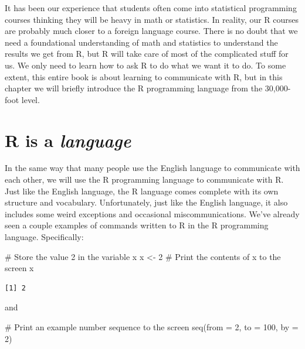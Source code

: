 \documentclass[
  letterpaper,
  DIV=11,
  numbers=noendperiod]{scrreprt}
\newenvironment{Shaded}{\begin{snugshade}}{\end{snugshade}}
\newcommand{\AttributeTok}[1]{\textcolor[rgb]{0.40,0.45,0.13}{#1}}
\newcommand{\CommentTok}[1]{\textcolor[rgb]{0.37,0.37,0.37}{#1}}
\newcommand{\DecValTok}[1]{\textcolor[rgb]{0.68,0.00,0.00}{#1}}
\newcommand{\FunctionTok}[1]{\textcolor[rgb]{0.28,0.35,0.67}{#1}}
\newcommand{\NormalTok}[1]{\textcolor[rgb]{0.00,0.23,0.31}{#1}}
\newcommand{\OtherTok}[1]{\textcolor[rgb]{0.00,0.23,0.31}{#1}}
\begin{document}
It has been our experience that students often come into statistical
programming courses thinking they will be heavy in math or statistics.
In reality, our R courses are probably much closer to a foreign language
course. There is no doubt that we need a foundational understanding of
math and statistics to understand the results we get from R, but R will
take care of most of the complicated stuff for us. We only need to learn
how to ask R to do what we want it to do. To some extent, this entire
book is about learning to communicate with R, but in this chapter we
will briefly introduce the R programming language from the 30,000-foot
level.

\section{\texorpdfstring{R is a
\emph{language}}{R is a language}}\label{r-is-a-language}

In the same way that many people use the English language to communicate
with each other, we will use the R programming language to communicate
with R. Just like the English language, the R language comes complete
with its own structure and vocabulary. Unfortunately, just like the
English language, it also includes some weird exceptions and occasional
miscommunications. We've already seen a couple examples of commands
written to R in the R programming language. Specifically:

\begin{Shaded}
\begin{Highlighting}[]
\CommentTok{\# Store the value 2 in the variable x}
\NormalTok{x }\OtherTok{\textless{}{-}} \DecValTok{2}
\CommentTok{\# Print the contents of x to the screen}
\NormalTok{x}
\end{Highlighting}
\end{Shaded}

\begin{verbatim}
[1] 2
\end{verbatim}

and

\begin{Shaded}
\begin{Highlighting}[]
\CommentTok{\# Print an example number sequence to the screen}
\FunctionTok{seq}\NormalTok{(}\AttributeTok{from =} \DecValTok{2}\NormalTok{, }\AttributeTok{to =} \DecValTok{100}\NormalTok{, }\AttributeTok{by =} \DecValTok{2}\NormalTok{)}
\end{Highlighting}
\end{Shaded}
\end{document}
